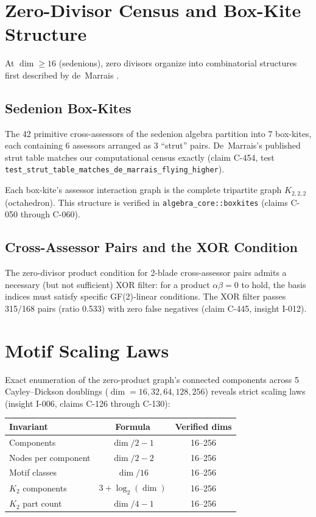 \documentclass{article}
\theoremstyle{definition}
\theoremstyle{plain}
\theoremstyle{remark}
\begin{document}
\section{Zero-Divisor Census and Box-Kite Structure}
\label{sec:zd}

At $\dim \geq 16$ (sedenions), zero divisors organize into combinatorial
structures first described by de~Marrais \cite{demarrais2000, demarrais2004boxkites}.

\subsection{Sedenion Box-Kites}

The 42 primitive cross-assessors of the sedenion algebra partition into 7
box-kites, each containing 6 assessors arranged as 3 ``strut'' pairs.
De~Marrais's published strut table matches our computational census exactly
(claim C-454, test \texttt{test\_strut\_table\_matches\_de\_marrais\_flying\_higher}).

Each box-kite's assessor interaction graph is the complete tripartite graph
$K_{2,2,2}$ (octahedron).  This structure is verified in
\texttt{algebra\_core::boxkites} (claims C-050 through C-060).

\subsection{Cross-Assessor Pairs and the XOR Condition}

The zero-divisor product condition for 2-blade cross-assessor pairs admits a
necessary (but not sufficient) XOR filter: for a product $\alpha\beta = 0$
to hold, the basis indices must satisfy specific GF(2)-linear conditions.
The XOR filter passes 315/168 pairs (ratio 0.533) with zero false negatives
(claim C-445, insight I-012).

\section{Motif Scaling Laws}
\label{sec:motifs}

Exact enumeration of the zero-product graph's connected components across
5 Cayley--Dickson doublings ($\dim = 16, 32, 64, 128, 256$) reveals strict
scaling laws (insight I-006, claims C-126 through C-130):

\begin{center}
\begin{tabular}{lcc}
\hline
\textbf{Invariant} & \textbf{Formula} & \textbf{Verified dims} \\
\hline
Components & $\dim/2 - 1$ & 16--256 \\
Nodes per component & $\dim/2 - 2$ & 16--256 \\
Motif classes & $\dim/16$ & 16--256 \\
$K_2$ components & $3 + \log_2(\dim)$ & 16--256 \\
$K_2$ part count & $\dim/4 - 1$ & 16--256 \\
\hline
\end{tabular}
\end{center}
\end{document}
